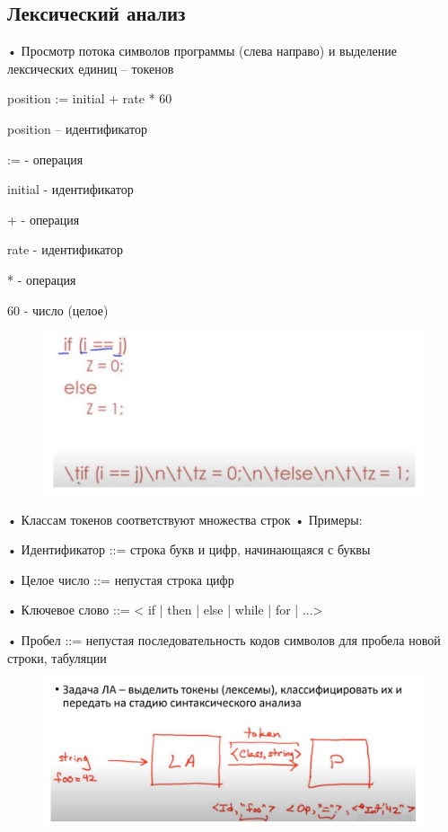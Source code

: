 \documentclass{article}
\begin{document}
\subsection{Лексический анализ}

• Просмотр потока символов программы (слева направо) и выделение
лексических единиц – токенов

position := initial + rate * 60

position – идентификатор

:= - операция

initial - идентификатор

+ - операция

rate - идентификатор

* - операция

60 - число (целое)

\begin{figure}[H]
    \centering
    \includegraphics[width=1\linewidth]{Снимок экрана 2025-02-13 090554.png}
\end{figure}

• Классам токенов соответствуют множества строк
• Примеры:

• Идентификатор ::= строка букв и цифр, начинающаяся с буквы

• Целое число ::= непустая строка цифр

• Ключевое слово ::= < if | then | else | while | for | ...>

• Пробел ::= непустая последовательность кодов символов для
пробела новой строки, табуляции

\begin{figure}[H]
    \centering
    \includegraphics[width=1\linewidth]{Снимок экрана 2025-02-13 090702.png}
\end{figure}
\end{document}
